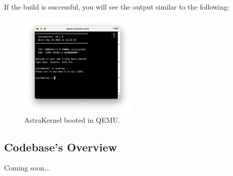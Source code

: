 \noindent
If the build is successful, you will see the output similar to the following:

\begin{figure}[H]
  \centering
  \includegraphics[width=0.5\textwidth]{figures/bootedKernel.png}
  \caption{AstraKernel booted in QEMU.}
  \label{fig:bootedKernel}
\end{figure}

\subsection{Codebase's Overview}
Coming soon...